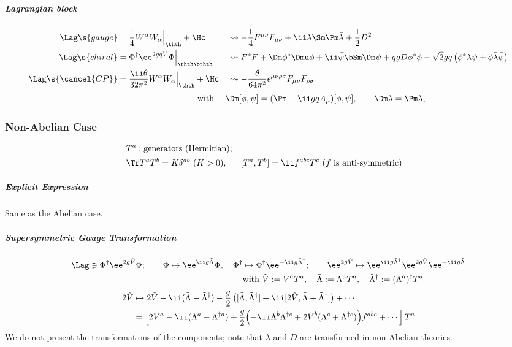 \subparagraph{Lagrangian block}\vspace{-14pt}
\begin{align*}
 \Lag\s{gauge}&= \frac14 W^\alpha W_\alpha\Big|_\thth + \Hc&&
\leadsto -\frac14F^{\mu\nu}F_{\mu\nu}+\ii\lambda\Sm\Pm\bar\lambda + \frac12 D^2\\
 \Lag\s{chiral}&=\Phi^\dagger\ee^{2gqV}\Phi\Big|_{\thth\bthth}&&
\leadsto F^*F+\Dm\phi^*\Dmu\phi+\ii\bar\psi\bSm\Dm\psi + qg D\phi^*\phi-\sqrt2gq\left(\phi^*\lambda\psi+\phi\bar\lambda\bar\psi\right)\\
 \Lag\s{\cancel{CP}}&= \frac{\ii\theta}{32\pi^2}W^\alpha W_\alpha\Big|_\thth + \Hc&&
\leadsto -\frac{\theta}{64\pi^2}\epsilon^{\mu\nu\rho\sigma}F_{\mu\nu}F_{\rho\sigma}
\end{align*}\vspace{-10pt}
\begin{equation*}
\hspace{100pt}
 \text{with\ }\quad \Dm[\phi,\psi]=(\Pm-\ii g q A_\mu)[\phi,\psi], \qquad\Dm\lambda=\Pm\lambda,
\end{equation*}


\subsubsection{Non-Abelian Case}
\begin{preposition}{}\vspace{-.5zw}
\begin{align*}
 &T^a:\text{generators (Hermitian)};\\
 &\Tr T^aT^b = K\delta^{ab}\ (K>0),&
 &[T^a,T^b]=\ii f^{abc}T^c\ \text{($f$ is anti-symmetric)}
\end{align*}\vspace{-3zw}
\end{preposition}\vspace{.7zw}

\subparagraph{Explicit Expression} Same as the Abelian case.

\subparagraph{Supersymmetric Gauge Transformation}
\begin{align}
\Lag\ni\Phi^\dagger\ee^{2g\tilde V}\Phi;
\qquad
 \Phi\mapsto \ee^{\ii g\tilde\Lambda}\Phi,\quad
 \Phi^\dagger&\mapsto \Phi^\dagger\ee^{-\ii g\tilde\Lambda^\dagger};\qquad
\ee^{2g\tilde V} \mapsto \ee^{\ii g\tilde\Lambda^\dagger}\ee^{2g\tilde V}\ee^{-\ii g\tilde\Lambda}\\
 &\text{with}\ \tilde V:=V^aT^a,\quad
 \tilde \Lambda := \Lambda^aT^a,\quad
 \tilde \Lambda^\dagger := (\Lambda^a)^\dagger T^a\notag
\end{align}
\begin{align}
 2\tilde V&\mapsto 2\tilde V-\ii(\tilde\Lambda-\tilde\Lambda^\dagger)-\frac g2\left(
 [\tilde\Lambda,\tilde\Lambda^\dagger]+\ii[2\tilde V,\tilde\Lambda+\tilde\Lambda^\dagger]\right)+\cdots\\
 &=\left[
 2V^a-\ii(\Lambda^a-\Lambda^{\dagger a})+\frac g2\Bigl(
-\ii\Lambda^b\Lambda^{\dagger c}+2V^b(\Lambda^c+\Lambda^{\dagger c})\Bigr)f^{abc}+\cdots\right]T^a
\end{align}
We do not present the transformations of the components; note that $\lambda$ and $D$ are transformed in non-Abelian theories.

